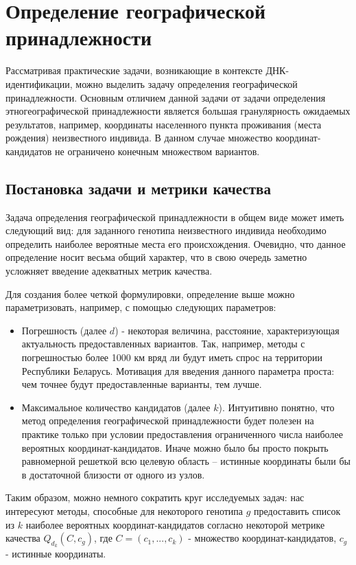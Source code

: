 \chapter{Определение географической принадлежности}

Рассматривая практические задачи, возникающие в контексте ДНК-идентификации, можно
выделить задачу определения географической принадлежности. Основным отличием данной задачи
от задачи определения этногеографической принадлежности является
большая гранулярность ожидаемых результатов, например, координаты населенного пункта проживания (места рождения)
неизвестного индивида. В данном случае множество координат-кандидатов не ограничено конечным множеством вариантов.

\section{Постановка задачи и метрики качества}
Задача определения географической принадлежности в общем виде может иметь следующий вид:
для заданного генотипа неизвестного индивида необходимо определить наиболее вероятные
места его происхождения. Очевидно, что данное определение носит весьма общий характер,
что в свою очередь заметно усложняет введение адекватных метрик качества.

Для создания более четкой формулировки, определение выше можно параметризовать, например,
с помощью следующих параметров:
\begin{itemize}
\item Погрешность (далее $d$) - некоторая величина, расстояние, характеризующая актуальность
предоставленных вариантов. Так, например, методы с погрешностью более 1000 км вряд ли
будут иметь спрос на территории Республики Беларусь. Мотивация для введения данного параметра проста:
чем точнее будут предоставленные варианты, тем лучше.

\item Максимальное количество кандидатов (далее $k$). Интуитивно понятно, что метод
определения географической принадлежности будет полезен на практике только при условии
предоставления ограниченного числа наиболее вероятных координат-кандидатов. Иначе можно было бы
просто покрыть равномерной решеткой всю целевую область -- истинные координаты были бы
в достаточной близости от одного из узлов.
\end{itemize}

Таким образом, можно немного сократить круг исследуемых задач:
нас интересуют методы, способные для некоторого генотипа $g$ предоставить список из $k$
наиболее вероятных координат-кандидатов согласно некоторой метрике качества $Q_{d}_{k} \left( C, c_{g} \right)$,
где $C = \left(c_{1}, ..., c_{k} \right)$ - множество координат-кандидатов, $c_{g}$ - истинные координаты.

